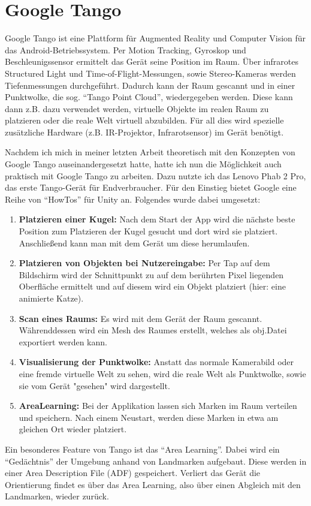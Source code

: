 
\section{Google Tango}
Google Tango ist eine Plattform für Augmented Reality und Computer Vision für das Android-Betriebssystem. Per Motion Tracking, Gyroskop und Beschleunigssensor ermittelt das Gerät seine Position im Raum. Über infrarotes Structured Light und Time-of-Flight-Messungen, sowie Stereo-Kameras werden Tiefenmessungen durchgeführt. Dadurch kann der Raum gescannt und in einer Punktwolke, die sog. "`Tango Point Cloud"', wiedergegeben werden. Diese kann dann z.B. dazu verwendet werden, virtuelle Objekte im realen Raum zu platzieren oder die reale Welt virtuell abzubilden. Für all dies wird spezielle zusätzliche Hardware (z.B. IR-Projektor, Infrarotsensor) im Gerät benötigt. \cite{fehling}

Nachdem ich mich in meiner letzten Arbeit theoretisch mit den Konzepten von Google Tango auseinandergesetzt hatte, hatte ich nun die Möglichkeit auch praktisch mit Google Tango zu arbeiten. Dazu nutzte ich das Lenovo Phab 2 Pro, das erste Tango-Gerät für Endverbraucher. Für den Einstieg bietet Google eine Reihe von "`HowTos"' für Unity an. Folgendes wurde dabei umgesetzt:
\begin{enumerate}
	\item\textbf{Platzieren einer Kugel:} Nach dem Start der App wird die nächste beste Position zum Platzieren der Kugel gesucht und dort wird sie platziert. Anschließend kann man mit dem Gerät um diese herumlaufen.
	\item\textbf{Platzieren von Objekten bei Nutzereingabe:} Per Tap auf dem Bildschirm wird der Schnittpunkt zu auf dem berührten Pixel liegenden Oberfläche ermittelt und auf diesem wird ein Objekt platziert (hier: eine animierte Katze).
	\item\textbf{Scan eines Raums:} Es wird mit dem Gerät der Raum gescannt. Währenddessen wird ein Mesh des Raumes erstellt, welches als obj.Datei exportiert werden kann.
	\item\textbf{Visualisierung der Punktwolke:} Anstatt das normale Kamerabild oder eine fremde virtuelle Welt zu sehen, wird die reale Welt als Punktwolke, sowie sie vom Gerät "gesehen" wird dargestellt.
	\item\textbf{AreaLearning:} Bei der Applikation lassen sich Marken im Raum verteilen und speichern. Nach einem Neustart, werden diese Marken in etwa am gleichen Ort wieder platziert.
\end{enumerate}
Ein besonderes Feature von Tango ist das "`Area Learning"'. Dabei wird ein "`Gedächtnis"' der Umgebung anhand von Landmarken aufgebaut. Diese werden in einer Area Description File (ADF) gespeichert. Verliert das Gerät die Orientierung findet es über das Area Learning, also über einen Abgleich mit den Landmarken, wieder zurück.\cite{fehling}

